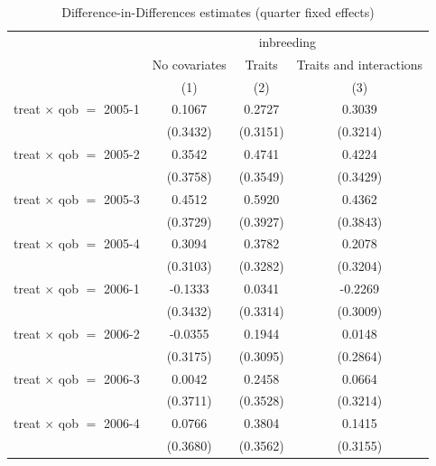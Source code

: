 
\begin{table}[H]
   \caption{\label{tab:table3} Difference-in-Differences estimates (quarter fixed effects)}
   \bigskip
   \centering
   \footnotesize
   \begin{tabular}{lccc}
      \toprule
       & \multicolumn{3}{c}{inbreeding}\\
                                     & No covariates & Traits         & Traits and interactions \\   
                                     & (1)           & (2)            & (3)\\  
      \midrule 
      treat $\times$ qob $=$ 2005-1  & 0.1067        & 0.2727         & 0.3039\\   
                                     & (0.3432)      & (0.3151)       & (0.3214)\\   
      treat $\times$ qob $=$ 2005-2  & 0.3542        & 0.4741         & 0.4224\\   
                                     & (0.3758)      & (0.3549)       & (0.3429)\\   
      treat $\times$ qob $=$ 2005-3  & 0.4512        & 0.5920         & 0.4362\\   
                                     & (0.3729)      & (0.3927)       & (0.3843)\\   
      treat $\times$ qob $=$ 2005-4  & 0.3094        & 0.3782         & 0.2078\\   
                                     & (0.3103)      & (0.3282)       & (0.3204)\\   
      treat $\times$ qob $=$ 2006-1  & -0.1333       & 0.0341         & -0.2269\\   
                                     & (0.3432)      & (0.3314)       & (0.3009)\\   
      treat $\times$ qob $=$ 2006-2  & -0.0355       & 0.1944         & 0.0148\\   
                                     & (0.3175)      & (0.3095)       & (0.2864)\\   
      treat $\times$ qob $=$ 2006-3  & 0.0042        & 0.2458         & 0.0664\\   
                                     & (0.3711)      & (0.3528)       & (0.3214)\\   
      treat $\times$ qob $=$ 2006-4  & 0.0766        & 0.3804         & 0.1415\\   
                                     & (0.3680)      & (0.3562)       & (0.3155)\\   

\end{tabular}
\end{table}
